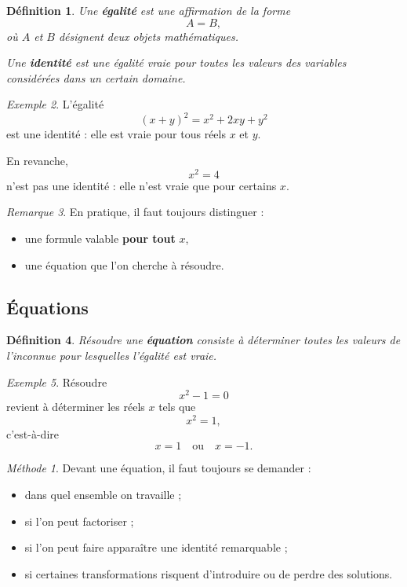 \documentclass[11pt,a4paper]{article}
\newtheorem{definition}{Définition}[section]
\theoremstyle{remark}
\newtheorem{remarque}[definition]{Remarque}
\newtheorem{exemple}[definition]{Exemple}
\newtheorem*{methode}{Méthode}
\begin{document}
\begin{definition}
Une \textbf{égalité} est une affirmation de la forme
\[
A=B,
\]
où \(A\) et \(B\) désignent deux objets mathématiques.

Une \textbf{identité} est une égalité vraie pour toutes les valeurs des variables considérées dans un certain domaine.
\end{definition}

\begin{exemple}
L’égalité
\[
(x+y)^2=x^2+2xy+y^2
\]
est une identité : elle est vraie pour tous réels \(x\) et \(y\).

En revanche,
\[
x^2=4
\]
n’est pas une identité : elle n’est vraie que pour certains \(x\).
\end{exemple}

\begin{remarque}
En pratique, il faut toujours distinguer :
\begin{itemize}
    \item une formule valable \textbf{pour tout} \(x\),
    \item une équation que l’on cherche à résoudre.
\end{itemize}
\end{remarque}

\subsection{Équations}

\begin{definition}
Résoudre une \textbf{équation} consiste à déterminer toutes les valeurs de l’inconnue pour lesquelles l’égalité est vraie.
\end{definition}

\begin{exemple}
Résoudre
\[
x^2-1=0
\]
revient à déterminer les réels \(x\) tels que
\[
x^2=1,
\]
c’est-à-dire
\[
x=1 \quad \text{ou} \quad x=-1.
\]
\end{exemple}

\begin{methode}
Devant une équation, il faut toujours se demander :
\begin{itemize}
    \item dans quel ensemble on travaille ;
    \item si l’on peut factoriser ;
    \item si l’on peut faire apparaître une identité remarquable ;
    \item si certaines transformations risquent d’introduire ou de perdre des solutions.
\end{itemize}
\end{methode}
\end{document}
